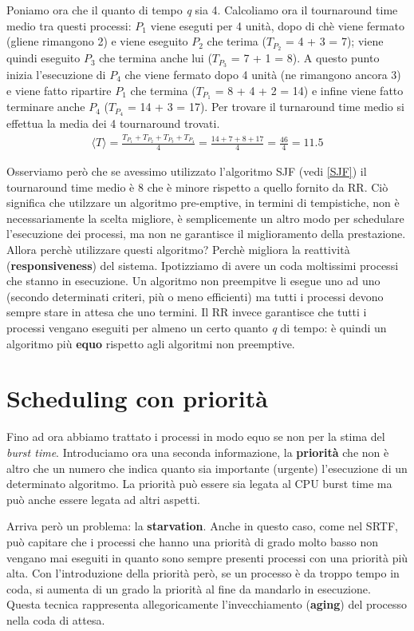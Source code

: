 \noindent Poniamo ora che il quanto di tempo \textit{q} sia 4. Calcoliamo ora il tournaround time medio tra questi processi: $P_1$ viene eseguti per 4 unità, dopo di chè viene fermato (gliene rimangono 2) e viene eseguito $P_2$ che terima ($T_{P_2}$ = 4 + 3 = 7); viene quindi eseguito $P_3$ che termina anche lui ($T_{P_3}$ = 7 + 1 = 8). A questo punto inizia l'esecuzione di $P_4$ che viene fermato dopo 4 unità (ne rimangono ancora 3) e viene fatto ripartire $P_1$ che termina ($T_{P_1}$ = 8 + 4 + 2 = 14) e infine viene fatto terminare anche $P_4$ ($T_{P_4}$ = 14 + 3 = 17). Per trovare il turnaround time medio si effettua la media dei 4 tournaround trovati.
\begin{gather*}
    \langle T \rangle = \frac{ T_{P_1} + T_{P_2} + T_{P_3} + T_{P_4}}{4} = \frac{14 + 7 + 8 + 17}{4} = \frac{46}{4} = 11.5
\end{gather*}

Osserviamo però che se avessimo utilizzato l'algoritmo SJF (vedi \ref{SJF}) il tournaround time medio è 8 che è minore rispetto a quello fornito da RR. Ciò significa che utilzzare un algoritmo pre-emptive, in termini di tempistiche, non è necessariamente la scelta migliore, è semplicemente un altro modo per schedulare l'esecuzione dei processi, ma non ne garantisce il miglioramento della prestazione. Allora perchè utilizzare questi algoritmo? Perchè migliora la reattività (\textbf{responsiveness}) del sistema. Ipotizziamo di avere un coda moltissimi processi che stanno in esecuzione. Un algoritmo non preempitve li esegue uno ad uno (secondo determinati criteri, più o meno efficienti) ma tutti i processi devono sempre stare in attesa che uno termini. Il RR invece garantisce che tutti i processi vengano eseguiti per almeno un certo quanto \textit{q} di tempo: è quindi un algoritmo più \textbf{equo} rispetto agli algoritmi non preemptive.

% 
\section{Scheduling con priorità} \label{priority scheduling}
Fino ad ora abbiamo trattato i processi in modo equo se non per la stima del \textit{burst time}. Introduciamo ora una seconda informazione, la \textbf{priorità} che non è altro che un numero che indica quanto sia importante (urgente) l'esecuzione di un determinato algoritmo. La priorità può essere sia legata al CPU burst time ma può anche essere legata ad altri aspetti. 

Arriva però un problema: la \textbf{starvation}. Anche in questo caso, come nel SRTF, può capitare che i processi che hanno una priorità di grado molto basso non vengano mai eseguiti in quanto sono sempre presenti processi con una priorità più alta. Con l'introduzione della priorità però, se un processo è da troppo tempo in coda, si aumenta di un grado la priorità al fine da mandarlo in esecuzione. Questa tecnica rappresenta allegoricamente l'invecchiamento (\textbf{aging}) del processo nella coda di attesa. 

